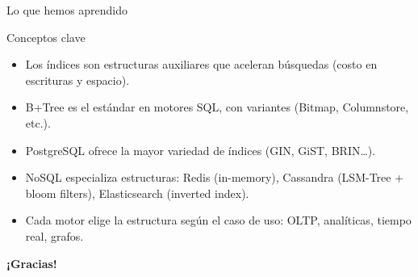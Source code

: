 \documentclass[aspectratio=169, 10pt, xcolor=table]{beamer}
\begin{document}
\begin{frame}{Lo que hemos aprendido}
    \begin{exampleblock}{Conceptos clave}
        \begin{itemize}
            \item Los índices son estructuras auxiliares que aceleran búsquedas (costo en escrituras y espacio).
            \item B+Tree es el estándar en motores SQL, con variantes (Bitmap, Columnstore, etc.).
            \item PostgreSQL ofrece la mayor variedad de índices (GIN, GiST, BRIN…).
            \item NoSQL especializa estructuras: Redis (in-memory), Cassandra (LSM-Tree + bloom filters), Elasticsearch (inverted index).
            \item Cada motor elige la estructura según el caso de uso: OLTP, analíticas, tiempo real, grafos.
        \end{itemize}
    \end{exampleblock}
\end{frame}

\begin{frame}
    \centering
    \Huge \textbf{¡Gracias!}
\end{frame}
\end{document}

